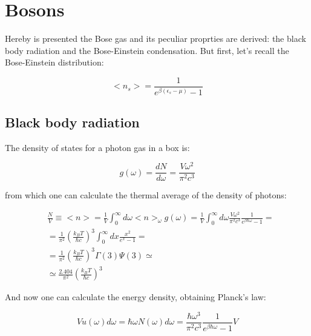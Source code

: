 \documentclass{article}
\begin{document}
\section{Bosons}

Hereby is presented the Bose gas and its peculiar proprties are derived:
the black body radiation and the Bose-Einstein condensation.
But first, let's recall the Bose-Einstein distribution:

\begin{equation}
    <n_s>=\frac{1}{e^{\beta(\epsilon_s-\mu)}-1}
\end{equation}


\subsection{Black body radiation}

The density of states for a photon gas in a box is:

\begin{equation}
    g(\omega)=\frac{d N}{d\omega}=\frac{V\omega^2}{\pi^2c^3}
\end{equation}

from which one can calculate the thermal average of the density of photons:

\begin{equation}
    \begin{aligned}
         & \frac{N}{V}\equiv<n>=\frac{1}{V}\int_0^\infty d\omega <n>_\omega g(\omega)=\frac{1}{V}\int_0^\infty d\omega \frac{V\omega^2}{\pi^2c^3}\frac{1}{e^{\beta\hbar\omega}-1}= \\
         & =\frac{1}{\pi^2}\left(\frac{k_B T}{\hbar c}\right)^3\int_0^\infty dx \frac{x^2}{e^x-1}=                                                                                 \\
         & = \frac{1}{\pi^2}\left(\frac{k_B T}{\hbar c}\right)^3 \Gamma(3)\Psi(3)\simeq                                                                                            \\
         & \simeq \frac{2.404}{\pi^2}\left(\frac{k_B T}{\hbar c}\right)^3
    \end{aligned}
\end{equation}

And now one can calculate the energy density, obtaining Planck's law:

\begin{equation}
    V u(\omega)d\omega=\hbar \omega N(\omega)d\omega=\frac{\hbar \omega^3}{\pi^2c^3}\frac{1}{e^{\beta\hbar\omega}-1}V
\end{equation}
\end{document}
